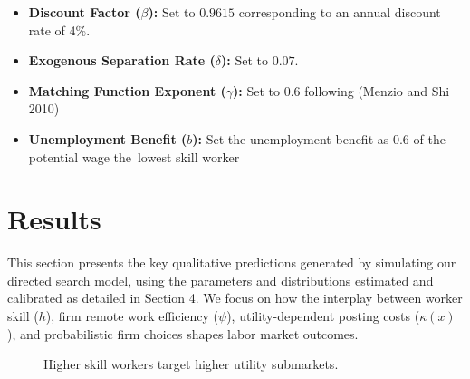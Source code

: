 \documentclass[
  11pt,
  letterpaper,
  DIV=11,
  numbers=noendperiod]{scrartcl}
\providecommand{\tightlist}{%
  \setlength{\itemsep}{0pt}\setlength{\parskip}{0pt}}\usepackage{longtable,booktabs,array}
\theoremstyle{plain}
\theoremstyle{remark}
\begin{document}
\begin{itemize}
\tightlist
\item
  \textbf{Discount Factor (\(\beta\)):} Set to \(0.9615\) corresponding
  to an annual discount rate of 4\%.
\item
  \textbf{Exogenous Separation Rate (\(\delta\)):} Set to \(0.07\).
\item
  \textbf{Matching Function Exponent (\(\gamma\)):} Set to \(0.6\)
  following (Menzio and Shi 2010)
\item
  \textbf{Unemployment Benefit (\(b\)):} Set the unemployment benefit as
  \(0.6\) of the potential wage the~lowest skill worker
\end{itemize}

\section{Results}\label{results}

This section presents the key qualitative predictions generated by
simulating our directed search model, using the parameters and
distributions estimated and calibrated as detailed in Section 4. We
focus on how the interplay between worker skill (\(h\)), firm remote
work efficiency (\(\psi\)), utility-dependent posting costs
(\(\kappa(x)\)), and probabilistic firm choices shapes labor market
outcomes.

\begin{figure}


\caption{\label{fig-worker_search_policy}Higher skill workers target
higher utility submarkets.}

\end{figure}%
\end{document}
